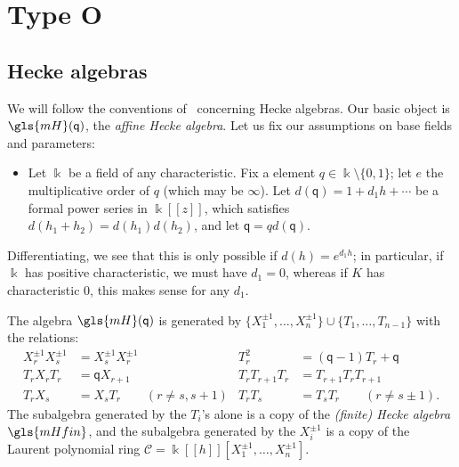 \documentclass[ALCO,ThmDefs,Unicode,epreuves]{cedram}
\newcommand{\pq}{\mathsf{q}}
\newcommand{\K}{\Bbbk}%
\newcommand\llbracket{[\![}
\newcommand\rrbracket{]\!]}
\begin{document}
\section{Type O}

\subsection{Hecke algebras}
We will follow the conventions of~\cite{BKKL} concerning Hecke
algebras. 
Our basic object is $\gls{mH}(\pq)$, the \emph{affine Hecke algebra}. 
Let us fix our assumptions on base fields and parameters:
\begin{itemize}
\item [$(*)$] Let $\K$ be a field of any characteristic. Fix a element
$q\in \K\setminus\{0,1\}$; let $e$ the multiplicative order of $q$
(which may be $\infty$). Let $d(\pq)=1+d_1h+\cdots$ be a formal power series in
$\K\llbracket z\rrbracket $, which satisfies $d(h_1+h_2)=d(h_1)d(h_2)$, and let $\pq=qd(\pq)$. 
\end{itemize}
Differentiating, we see that this is only possible if $d(h)=e^{d_1h}$; in
particular, if $\K$ has positive characteristic, we must have
$d_1=0$, whereas if $K$ has characteristic 0, this makes sense for any
$d_1$.




The algebra $\gls{mH}(\pq)$ is generated by $\{X_1^{\pm 1},\dots,X_n^{\pm 1}
\}\cup \{T_1,\dots, T_{n-1}\}$ with the relations:
\begin{align*}
 X_r^{\pm 1} X_s^{\pm 1}&= X_s^{\pm 1} X_r^{\pm 1}& T_r^2&=(\pq-1)T_r
+\pq\\
T_rX_rT_r&=\pq X_{r+1} & T_rT_{r+1}T_r&=T_{r+1}T_r T_{r+1}\\
T_rX_s&= X_sT_r\qquad (r\neq s,s+1)&T_rT_s&=T_sT_r\qquad (r \neq
s\pm 1).
 \end{align*}
The subalgebra generated by the $T_i$'s alone is a copy of the \emph{(finite) Hecke algebra} $\gls{mHfin}$, and the subalgebra generated by the
$X_i^{\pm 1}$ is a copy of the Laurent polynomial ring
$\mathcal{C}=\K\llbracket h\rrbracket [X_1^{\pm 1},\dots,X_n^{\pm 1}]$.
 
\end{document}
